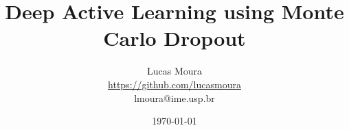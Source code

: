 \title{Deep Active Learning using Monte Carlo Dropout}
\date{\today}

\author{
  Lucas Moura\\
  \url{https://github.com/lucasmoura}\\
  lmoura@ime.usp.br
}

